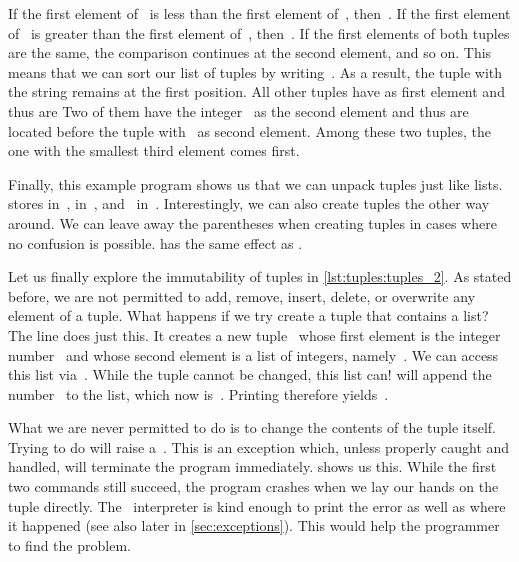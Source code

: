 If the first element of~ is less than the first element of~, then~.
If the first element of~ is greater than the first element of~, then~.
If the first elements of both tuples are the same, the comparison continues at the second element, and so on.
This means that we can sort our list of tuples by writing~.
As a result, the tuple with the string  remains at the first position.
All other tuples have  as first element and thus are 
Two of them have the integer~ as the second element and thus are located before the tuple with~ as second element.
Among these two tuples, the one with the smallest third element comes first.

Finally, this example program shows us that we can unpack tuples just like lists.
 stores  in~,  in~, and~ in~.
Interestingly, we can also create tuples the other way around.
We can leave away the parentheses when creating tuples in cases where no confusion is possible.
 has the same effect as .

Let us finally explore the immutability of tuples in \cref{lst:tuples:tuples_2}.
As stated before, we are not permitted to add, remove, insert, delete, or overwrite any element of a tuple.
What happens if we try create a tuple that contains a list?
The line  does just this.
It creates a new tuple~ whose first element is the integer number~ and whose second element is a list of integers, namely~\pythonil{[2]}.
We can access this list via~.
While the tuple cannot be changed, this list can!
 will append the number~ to the list, which now is~\pythonil{[2, 2]}.
Printing  therefore yields~.

What we are never permitted to do is to change the contents of the tuple itself.
Trying to do  will raise a~.
This is an exception which, unless properly caught and handled, will terminate the program immediately.
 shows us this.
While the first two  commands still succeed, the program crashes when we lay our hands on the tuple directly.
The \python\ interpreter is kind enough to print the error as well as where it happened (see also later in \cref{sec:exceptions}).
This would help the programmer to find the problem.


